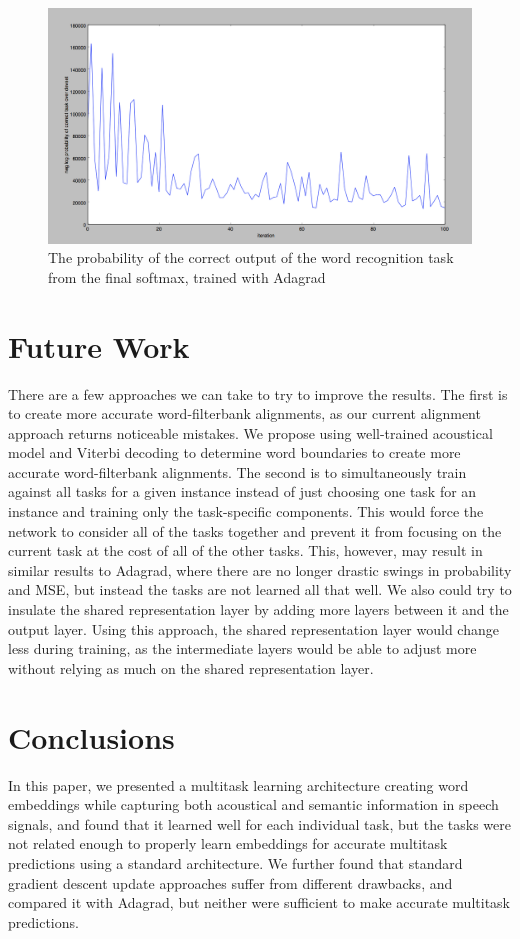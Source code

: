\documentclass{article}
\begin{document}
\begin{figure}[h!]
\centering
\includegraphics[scale=.2]{images/adagrad_word_prediction.png}
\caption{The probability of the correct output of the word recognition task from the final softmax, trained with Adagrad}
\label{fig:prob_word_ada}
\end{figure}

\section{Future Work}
There are a few approaches we can take to try to improve the results.  The first is to create more accurate word-filterbank alignments, as our current alignment approach returns noticeable mistakes.  We propose using well-trained acoustical model and Viterbi decoding to determine word boundaries to create more accurate word-filterbank alignments.  The second is to simultaneously train against all tasks for a given instance instead of just choosing one task for an instance and training only the task-specific components.  This would force the network to consider all of the tasks together and prevent it from focusing on the current task at the cost of all of the other tasks.  This, however, may result in similar results to Adagrad, where there are no longer drastic swings in probability and MSE, but instead the tasks are not learned all that well.  We also could try to insulate the shared representation layer by adding more layers between it and the output layer.  Using this approach, the shared representation layer would change less during training, as the intermediate layers would be able to adjust more without relying as much on the shared representation layer.

\section{Conclusions}
In this paper, we presented a multitask learning architecture creating word embeddings while capturing both acoustical and semantic information in speech signals, and found that it learned well for each individual task, but the tasks were not related enough to properly learn embeddings for accurate multitask predictions using a standard architecture.  We further found that standard gradient descent update approaches suffer from different drawbacks, and compared it with Adagrad, but neither were sufficient to make accurate multitask predictions.



\end{document}
